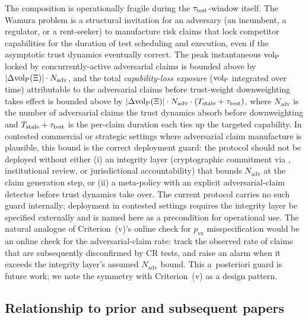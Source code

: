 The composition is operationally fragile during the
$\tau_{\mathrm{test}}$-window itself.  The Wamura problem is a structural
invitation for an adversary (an incumbent, a regulator, or a
rent-seeker) to manufacture risk claims that lock competitor
capabilities for the duration of test scheduling and execution,
even if the asymptotic trust dynamics eventually correct.  The
peak instantaneous ${\operatorname{vol}_{\mathrm{P}}}$ locked by concurrently-active
adversarial claims is bounded above by
$|\Delta {\operatorname{vol}_{\mathrm{P}}}(\Xi)| \cdot N_{\mathrm{adv}}$, and the
total \emph{capability-loss exposure} (${\operatorname{vol}_{\mathrm{P}}}$ integrated over
time) attributable to the adversarial claims before trust-weight
downweighting takes effect is bounded above by
$|\Delta {\operatorname{vol}_{\mathrm{P}}}(\Xi)| \cdot N_{\mathrm{adv}} \cdot
(T_{\mathrm{stale}} + \tau_{\mathrm{test}})$, where $N_{\mathrm{adv}}$ is
the number of adversarial claims the trust dynamics absorb
before downweighting and $T_{\mathrm{stale}} + \tau_{\mathrm{test}}$ is the
per-claim duration each ties up the targeted capability.  In
contested commercial or strategic settings where adversarial
claim manufacture is plausible, this bound is the correct
deployment guard: the protocol should not be deployed without
either (i) an integrity layer (cryptographic commitment via
\citep{lasser2026exo}, institutional review, or jurisdictional
accountability) that bounds $N_{\mathrm{adv}}$ at the claim
generation step, or (ii) a meta-policy with an explicit
adversarial-claim detector before trust dynamics take over.
The current protocol carries no such guard internally;
deployment in contested settings requires the integrity layer be
specified externally and is named here as a precondition for
operational use.  The natural analogue of Criterion~(v)'s online
check for $p_{\mathrm{ex}}$ misspecification would be an online
check for the adversarial-claim rate: track the observed rate of
claims that are subsequently disconfirmed by CR tests, and raise
an alarm when it exceeds the integrity layer's assumed
$N_{\mathrm{adv}}$ bound.  This a~posteriori guard is future
work; we note the symmetry with Criterion~(v) as a design
pattern.

\subsection{Relationship to prior and subsequent papers}

